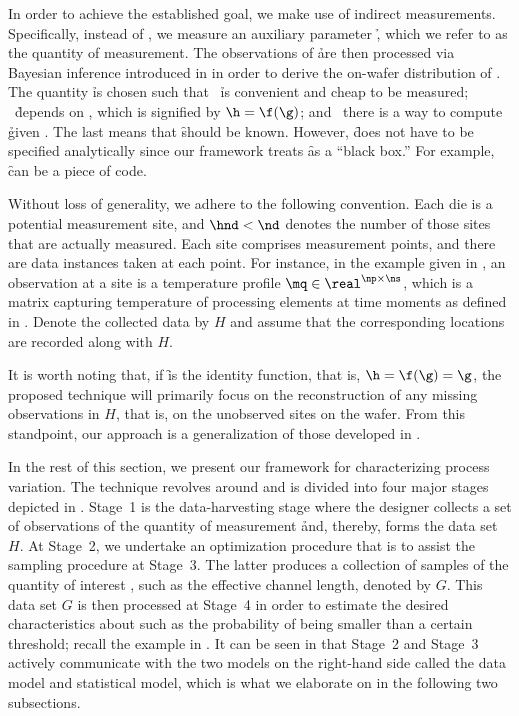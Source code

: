In order to achieve the established goal, we make use of indirect measurements.
Specifically, instead of \g, we measure an auxiliary parameter \h, which we
refer to as the quantity of measurement. The observations of \h are then
processed via Bayesian inference introduced in  in
order to derive the on-wafer distribution of \g. The quantity \h is chosen such
that \one~\h is convenient and cheap to be measured; \two~\h depends on \g,
which is signified by $\h = \f(\g)$; and \three~there is a way to compute \h
given \g. The last means that \f should be known. However, \f does not have to
be specified analytically since our framework treats \f as a ``black box.'' For
example, \f can be a piece of code.

Without loss of generality, we adhere to the following convention. Each die is a
potential measurement site, and $\hnd < \nd$ denotes the number of those sites
that are actually measured. Each site comprises \np measurement points, and
there are \ns data instances taken at each point. For instance, in the example
given in , an observation at a site is a temperature
profile $\mq \in \real^{\np \times \ns}$, which is a matrix capturing
temperature of \np processing elements at \ns time moments as defined in
. Denote the collected data by $H$ and assume that the
corresponding locations are recorded along with $H$.

It is worth noting that, if \f is the identity function, that is, $\h = \f(\g) =
\g$, the proposed technique will primarily focus on the reconstruction of any
missing observations in $H$, that is, on the unobserved sites on the wafer. From
this standpoint, our approach is a generalization of those developed in
\cite{reda2009, zhang2010}.

In the rest of this section, we present our framework for characterizing process
variation. The technique revolves around  and is divided
into four major stages depicted in . Stage~1 is the
data-harvesting stage where the designer collects a set of observations of the
quantity of measurement \h and, thereby, forms the data set $H$. At Stage~2, we
undertake an optimization procedure that is to assist the sampling procedure at
Stage~3. The latter produces a collection of samples of the quantity of interest
\g, such as the effective channel length, denoted by $G$. This data set $G$ is
then processed at Stage~4 in order to estimate the desired characteristics about
\g such as the probability of \g being smaller than a certain threshold; recall
the example in . It can be seen in
 that Stage~2 and Stage~3 actively communicate with the
two models on the right-hand side called the data model and statistical model,
which is what we elaborate on in the following two subsections.

